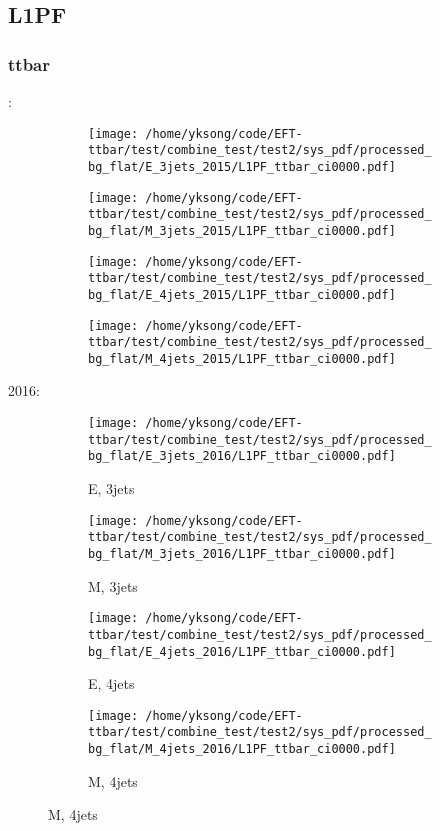 \documentclass{beamer}
\begin{document}
\subsection{L1PF}

\begin{frame}
\frametitle{ttbar}
\fontsize{5}{1}:
\begin{figure}
\centering
\begin{subfigure}[b]{0.24\textwidth}
\texttt{[image: /home/yksong/code/EFT-ttbar/test/combine\_test/test2/sys\_pdf/processed\_bg\_flat/E\_3jets\_2015/L1PF\_ttbar\_ci0000.pdf]}
\end{subfigure}
\begin{subfigure}[b]{0.24\textwidth}
\texttt{[image: /home/yksong/code/EFT-ttbar/test/combine\_test/test2/sys\_pdf/processed\_bg\_flat/M\_3jets\_2015/L1PF\_ttbar\_ci0000.pdf]}
\end{subfigure}
\begin{subfigure}[b]{0.24\textwidth}
\texttt{[image: /home/yksong/code/EFT-ttbar/test/combine\_test/test2/sys\_pdf/processed\_bg\_flat/E\_4jets\_2015/L1PF\_ttbar\_ci0000.pdf]}
\end{subfigure}
\begin{subfigure}[b]{0.24\textwidth}
\texttt{[image: /home/yksong/code/EFT-ttbar/test/combine\_test/test2/sys\_pdf/processed\_bg\_flat/M\_4jets\_2015/L1PF\_ttbar\_ci0000.pdf]}
\end{subfigure}
\end{figure}
2016:
\begin{figure}
\centering
\begin{subfigure}[b]{0.24\textwidth}
\texttt{[image: /home/yksong/code/EFT-ttbar/test/combine\_test/test2/sys\_pdf/processed\_bg\_flat/E\_3jets\_2016/L1PF\_ttbar\_ci0000.pdf]}
\captionsetup{font=tiny}
\caption{E, 3jets}
\end{subfigure}
\begin{subfigure}[b]{0.24\textwidth}
\texttt{[image: /home/yksong/code/EFT-ttbar/test/combine\_test/test2/sys\_pdf/processed\_bg\_flat/M\_3jets\_2016/L1PF\_ttbar\_ci0000.pdf]}
\captionsetup{font=tiny}
\caption{M, 3jets}
\end{subfigure}
\begin{subfigure}[b]{0.24\textwidth}
\texttt{[image: /home/yksong/code/EFT-ttbar/test/combine\_test/test2/sys\_pdf/processed\_bg\_flat/E\_4jets\_2016/L1PF\_ttbar\_ci0000.pdf]}
\captionsetup{font=tiny}
\caption{E, 4jets}
\end{subfigure}
\begin{subfigure}[b]{0.24\textwidth}
\texttt{[image: /home/yksong/code/EFT-ttbar/test/combine\_test/test2/sys\_pdf/processed\_bg\_flat/M\_4jets\_2016/L1PF\_ttbar\_ci0000.pdf]}
\captionsetup{font=tiny}
\caption{M, 4jets}
\end{subfigure}
\end{figure}
\end{frame}
\end{document}
